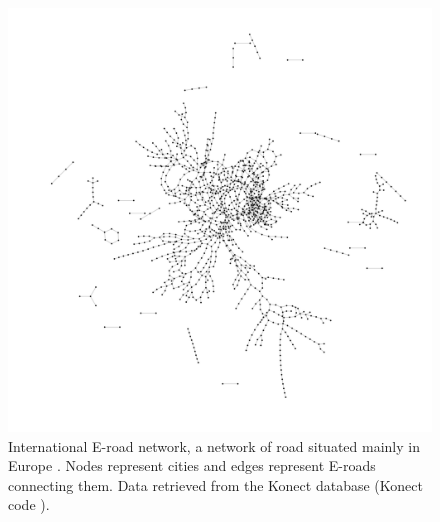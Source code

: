 \documentclass[
11pt, %
american, %
singlespacing, %
final, %
nolistspacing, %
liststotoc, %
headsepline, %
]{MastersDoctoralThesis} %
\begin{document}
\begin{figure}
	\includegraphics[width=\textwidth]{network-subelj_euroroad.pdf}
	\caption{International E-road network, a network of road situated mainly in Europe \cite{subelj2011robust}. Nodes represent cities and edges represent E-roads connecting them. Data retrieved from the Konect database \cite{kunegis2013konect} (Konect code ).}
	\label{Figure: Network euroroad}
\end{figure}
\end{document}
